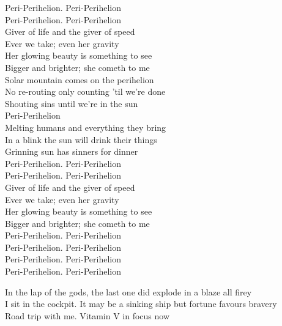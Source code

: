 Peri-Perihelion. Peri-Perihelion \\
Peri-Perihelion. Peri-Perihelion \\

Giver of life and the giver of speed \\
Ever we take; even her gravity \\
Her glowing beauty is something to see \\
Bigger and brighter; she cometh to me \\

Solar mountain comes on the perihelion \\
No re-routing only counting 'til we're done \\
Shouting sins until we're in the sun \\
Peri-Perihelion \\
Melting humans and everything they bring \\
In a blink the sun will drink their things \\
Grinning sun has sinners for dinner \\

Peri-Perihelion. Peri-Perihelion \\
Peri-Perihelion. Peri-Perihelion \\

Giver of life and the giver of speed \\
Ever we take; even her gravity \\
Her glowing beauty is something to see \\
Bigger and brighter; she cometh to me \\

Peri-Perihelion. Peri-Perihelion \\
Peri-Perihelion. Peri-Perihelion \\
Peri-Perihelion. Peri-Perihelion \\
Peri-Perihelion. Peri-Perihelion \\




In the lap of the gods, the last one did explode in a blaze all firey \\
I sit in the cockpit. It may be a sinking ship but fortune favours bravery \\
Road trip with me. Vitamin V in focus now \\

